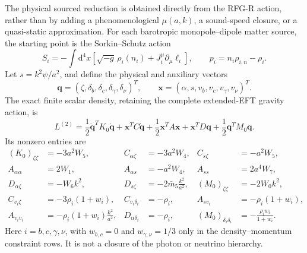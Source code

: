 \documentclass[11pt,a4paper]{article}
\renewcommand{\dd}{\mathrm{d}}
\begin{document}
The physical sourced reduction is obtained directly from the RFG-R action,
rather than by adding a phenomenological \(\mu(a,k)\), a sound-speed closure,
or a quasi-static approximation.  For each barotropic monopole--dipole
matter source, the starting point is the Sorkin--Schutz action
\cite{DeFeliceMatter}
\begin{equation}
 S_i=-\int\dd^4x\left[\sqrt{-g}\,\rho_i(n_i)
       +J_i^\mu\partial_\mu\ell_i\right],
 \qquad p_i=n_i\rho_{i,n}-\rho_i .
 \label{eq:RFGR-Sorkin-Schutz}
\end{equation}
Let \(s=k^2\psi/a^2\), and define the physical and auxiliary vectors
\begin{equation}
 \mathbf q=(\zeta,\delta_b,\delta_c,\delta_\gamma,\delta_\nu)^T,
 \qquad
 \mathbf x=(\alpha,s,v_b,v_c,v_\gamma,v_\nu)^T .
 \label{eq:RFGR-multifluid-variables}
\end{equation}
The exact finite scalar density, retaining the complete extended-EFT gravity
action, is
\begin{equation}
 L^{(2)}=\frac12\dot{\mathbf q}^{T}K_0\dot{\mathbf q}
 +\mathbf x^TC\dot{\mathbf q}+\frac12\mathbf x^TA\mathbf x
 +\mathbf x^TD\mathbf q+\frac12\mathbf q^TM_0\mathbf q .
 \label{eq:RFGR-multifluid-block-action}
\end{equation}
Its nonzero entries are
\begin{align}
 (K_0)_{\zeta\zeta}&=-3a^2W_5,&
 C_{\alpha\zeta}&=-3a^2W_4,& C_{s\zeta}&=-a^2W_5,\nonumber\\
 A_{\alpha\alpha}&=2W_1,& A_{\alpha s}&=-a^2W_4,&
 A_{ss}&=2a^4W_7,\nonumber\\
 D_{\alpha\zeta}&=-W_6k^2,&
 D_{s\zeta}&=-2\bar m_5\frac{k^2}{a^2},&
 (M_0)_{\zeta\zeta}&=-2W_0k^2,\nonumber\\
 C_{v_i\zeta}&=-3\rho_i(1+w_i),&
 C_{v_i\delta_i}&=-\rho_i,&
 A_{sv_i}&=-\rho_i(1+w_i),\nonumber\\
 A_{v_iv_i}&=-\rho_i(1+w_i)\frac{k^2}{a^2},&
 D_{\alpha\delta_i}&=-\rho_i,&
 (M_0)_{\delta_i\delta_i}&=-\frac{\rho_iw_i}{1+w_i}.
 \label{eq:RFGR-multifluid-blocks}
\end{align}
Here \(i=b,c,\gamma,\nu\), with \(w_{b,c}=0\) and \(w_{\gamma,\nu}=1/3\)
only in the density--momentum constraint rows.  It is not a closure of the
photon or neutrino hierarchy.
\end{document}
